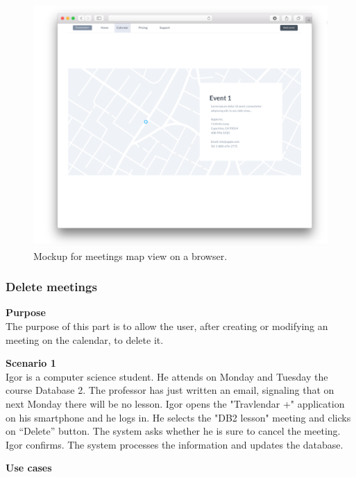 \documentclass{article}
\begin{document}
	\begin{figure}[h!]
		\bigskip
		\centering
		\includegraphics[scale=0.25]{img/mockups/mapView_w.png}
		\caption{Mockup for meetings map view on a browser.}
	\end{figure}


	\newpage
	\subsubsection{Delete meetings}
	
	\bigskip
	\noindent
	\textbf{Purpose} \\
	The purpose of this part is to allow the user, after creating or modifying an meeting on the calendar, to delete it.
	
	\bigskip
	\noindent
	\textbf{Scenario 1} \\
	Igor is a computer science student. He attends on Monday and Tuesday the course  Database 2. The professor has just written an email, signaling that on next Monday there will be no lesson. Igor opens the "Travlendar +" application on his smartphone and he logs in. He selects the "DB2 lesson" meeting and clicks on “Delete” button. The system asks whether he is sure to cancel the meeting. Igor confirms. The system processes the information and updates the database.
	
	\bigskip
	\noindent
	\textbf{Use cases} \\
	
\end{document}
